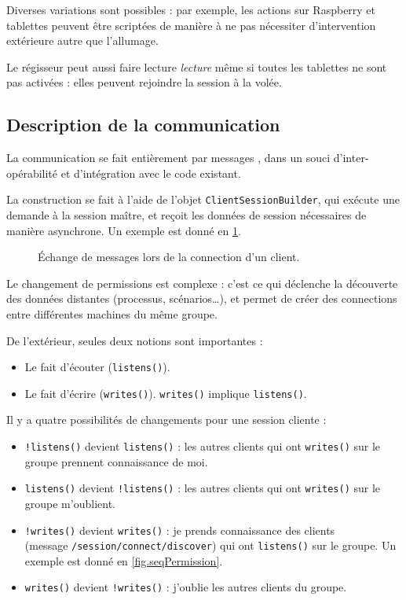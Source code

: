 Diverses variations sont possibles : par exemple, les actions sur Raspberry et tablettes peuvent être scriptées de manière à ne pas nécessiter d'intervention extérieure autre que l'allumage.

Le régisseur peut aussi faire lecture \textit{lecture} même si toutes les tablettes ne sont pas activées : elles peuvent rejoindre la session à la volée.

\subsection{Description de la communication}
La communication se fait entièrement par messages , dans un souci d'inter-opérabilité et d'intégration avec le code existant.

La construction se fait à l'aide de l'objet \texttt{ClientSessionBuilder}, qui exécute une demande à la session maître, et reçoit les données de session nécessaires de manière asynchrone.
Un exemple est donné en \cref{fig.connection}.

\begin{figure}[H]
	\centering
	
	\caption{Échange de messages lors de la connection d'un client.}
	\label{fig.connection}
\end{figure}

Le changement de permissions est complexe : c'est ce qui déclenche la découverte des données distantes (processus, scénarios\dots), et permet de créer des connections entre différentes machines du même groupe.

De l'extérieur, seules deux notions sont importantes : 
\begin{itemize}
	\item Le fait d'écouter (\texttt{listens()}).
	\item Le fait d'écrire (\texttt{writes()}). \texttt{writes()} implique \texttt{listens()}.
\end{itemize}

Il y a quatre possibilités de changements pour une session cliente : 
\begin{itemize}
	\item \texttt{!listens()} devient \texttt{listens()} : les autres clients qui ont \texttt{writes()} sur le groupe prennent connaissance de moi.
	\item \texttt{listens()} devient \texttt{!listens()} : les autres clients qui ont \texttt{writes()} sur le groupe m'oublient.
	\item \texttt{!writes()} devient \texttt{writes()} : je prends connaissance des clients ~ \\ (message \texttt{/session/connect/discover}) qui ont \texttt{listens()} sur le groupe. Un exemple est donné en \cref{fig.seqPermission}.
	\item \texttt{writes()} devient \texttt{!writes()} : j'oublie les autres clients du groupe.
\end{itemize}

